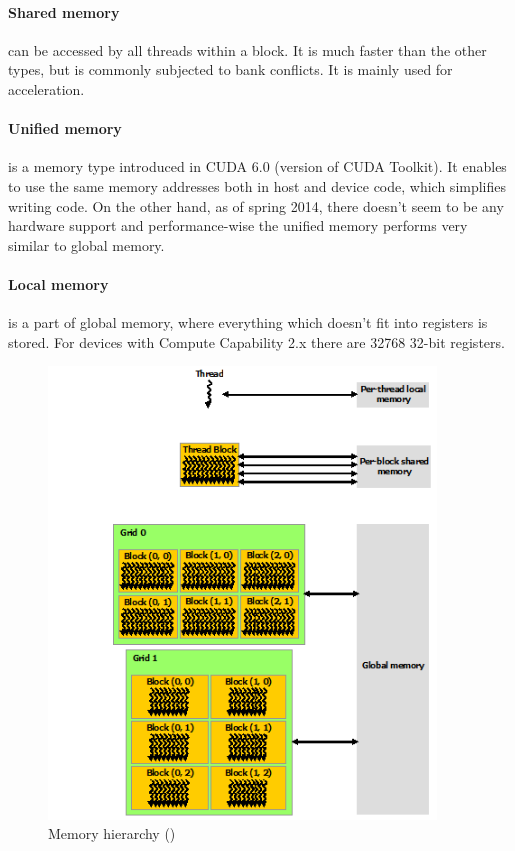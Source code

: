 \paragraph{Shared memory} can be accessed by all threads within a block. It is much faster than the other types, but is commonly subjected to bank conflicts. It is mainly used for acceleration.

\paragraph{Unified memory} is a memory type introduced in CUDA 6.0 (version of CUDA Toolkit). It enables to use the same memory addresses both in host and device code, which simplifies writing code. On the other hand, as of spring 2014, there doesn't seem to be any hardware support and performance-wise the unified memory performs very similar to global memory.

\paragraph{Local memory} is a part of global memory, where everything which doesn't fit into registers is stored. For devices with Compute Capability 2.x there are 32768 32-bit registers.

\begin{center}
\begin{figure}[ht]
	\centering\includegraphics[height=12cm]{fig/memory-hierarchy.png}
	\caption{Memory hierarchy (\cite{cuda-toolkit-docs})}
\end{figure}
\end{center}

